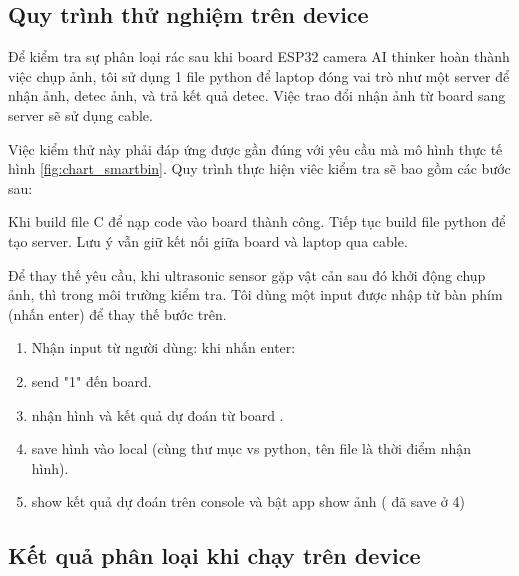 \subsection{Quy trình thử nghiệm trên device}
Để kiểm tra sự phân loại rác sau khi board ESP32 camera AI thinker hoàn thành việc chụp ảnh, tôi sử dụng 1 file python để laptop đóng vai trò như một server để nhận ảnh, detec ảnh, và trả kết quả detec. Việc trao đổi nhận ảnh từ board sang server sẽ sử dụng cable. 

Việc kiểm thử này phải đáp ứng được gần đúng với yêu cầu mà mô hình thực tế hình \ref{fig:chart_smartbin}. Quy trình thực hiện viêc kiểm tra sẽ bao gồm các bước sau:

Khi build file C để nạp code vào board thành công. Tiếp tục build file python để tạo server. Lưu ý vẫn giữ kết nối giữa board và laptop qua cable.

Để thay thế yêu cầu, khi ultrasonic sensor gặp vật cản sau đó khởi động chụp ảnh, thì trong môi trường kiểm tra. Tôi dùng một input được nhập từ bàn phím (nhấn enter) để thay thế bước trên. 
\begin{enumerate}
    \item Nhận input từ người dùng: khi nhấn enter: 
    \item send "1" đến board.
    \item nhận hình và kết quả dự đoán từ board .
    \item save hình vào local (cùng thư mục vs python, tên file là thời điểm nhận hình).
    \item show kết quả dự đoán trên console và bật app show ảnh ( đã save ở 4)
\end{enumerate}

\subsection{Kết quả phân loại khi chạy trên device}


